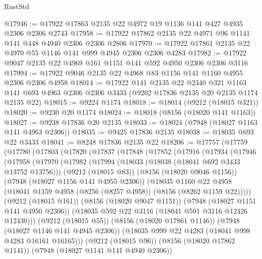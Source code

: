 \begin{lexlean}{RustStd}
\begin{coremodule}
@17946 := @17922 @17863 @2135 @22 @4972 @19 @1136 @141 @427 @4935 @2306 @2306 @2743
@17958 := @17922 @17862 @2135 @22 @4971 @96 @1141 @141 @448 @4940 @2306 @2306 @2806
@17970 := @17922 @17861 @2135 @22 @4970 @55 @1146 @141 @999 @4945 @2306 @2306 @4283
@17982 := @17922 @9047 @2135 @22 @4969 @161 @1151 @141 @592 @4950 @2306 @2306 @3116
@17994 := @17922 @9046 @2135 @22 @4968 @83 @1156 @141 @1160 @4955 @2306 @2306 @4958
@18014 := @17922
    @141
    @2135
    @22
    @2340
    @321
    @1163
    @141
    @693
    @4963
    @2306
    @2306
    @3433
    (@9202 @17836 @2135 @20 @2135 @1174 @2135 @22)
@18015 := @9224 @1174
@18018 := @18014 (@9212 (@18015 @321))
@18020 := @9230 @20 @1174
@18024 := @18018 (@8156 (@18020 @141 @1163))
@18027 := @9238 @17836 @20 @2135
@18033 := @18024 (@7948 (@18027 @1163 @141 @4963 @2306))
@18035 := @9425 @17836 @2135
@18038 := @18035 @693 @22 @3433
@18041 := @8248 @17836 @2135 @22
@18206 := @17757
    (@17759
      (@17780
        (@17803
          (@17820
            (@17837
              (@17848
                (@17852
                  (@17916
                    (@17934
                      (@17946
                        (@17958
                          (@17970
                            (@17982
                              (@17994
                                (@18033 (@18038 (@18041 @692 @3433 @13752 @13756)))
                                (@9212 (@18015 @83))
                                (@8156 (@18020 @9046 @1156))
                                (@7948 (@18027 @1156 @141 @4955 @2306))
                                (@18035
                                  @1160
                                  @22
                                  @4958
                                  (@18041
                                    @1159
                                    @4958
                                    (@8256 (@8257 @4958))
                                    (@8156 (@8262 @1159 @22)))))
                              (@9212 (@18015 @161))
                              (@8156 (@18020 @9047 @1151))
                              (@7948 (@18027 @1151 @141 @4950 @2306))
                              (@18035 @592 @22 @3116 (@18041 @591 @3116 @12426 @12430)))
                            (@9212 (@18015 @55))
                            (@8156 (@18020 @17861 @1146))
                            (@7948 (@18027 @1146 @141 @4945 @2306))
                            (@18035 @999 @22 @4283 (@18041 @998 @4283 @16161 @16165)))
                          (@9212 (@18015 @96))
                          (@8156 (@18020 @17862 @1141))
                          (@7948 (@18027 @1141 @141 @4940 @2306))

\end{coremodule}
\end{lexlean}
